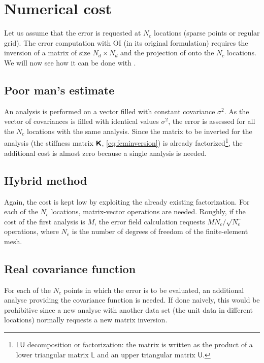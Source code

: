 \section{Numerical cost}

Let us assume that the error is requested at $N_{c}$ locations (sparse points or regular grid). The error computation with OI (in its original formulation) requires the inversion of a matrix of size $N_{d} \times N_{d}$ and the projection of onto the $N_{c}$ locations. We will now see how it can be done with \diva.

\subsection{Poor man's estimate}

An analysis is performed on a vector filled with constant covariance $\sigma^{2}$. As the vector of covariances is filled with identical values $\sigma^{2}$, the error is assessed for all the $N_{c}$ locations with the same analysis. Since the matrix to be inverted for the analysis (the stiffness matrix $\mbox{\boldmath $ \protect\mathsf{K} $}$, \eqref{eq:feminversion}) is already factorized\footnote{$\mathsf{LU}$ decomposition or factorization: the matrix is written as the product of a lower triangular matrix $\mathsf{L}$ and an upper triangular matrix $\mathsf{U}$.}, the additional cost is almost zero because a single analysis is needed.   

\subsection{Hybrid method} 

Again, the cost is kept low by exploiting the already existing factorization. For each of the $N_c$ locations, matrix-vector operations are needed. Roughly, if the cost of the first analysis is $M$, the error field calculation requests $M N_c/\sqrt{N_e}$ operations, where $N_e$ is the number of degrees of freedom of the finite-element mesh.

\subsection{Real covariance function}

For each of the $N_c$ points in which the error is to be evaluated, an additional analyse providing the covariance function is needed. If done naively, this would be prohibitive since a new analyse with another data set (the unit data in different locations) normally requests a new matrix inversion. 

